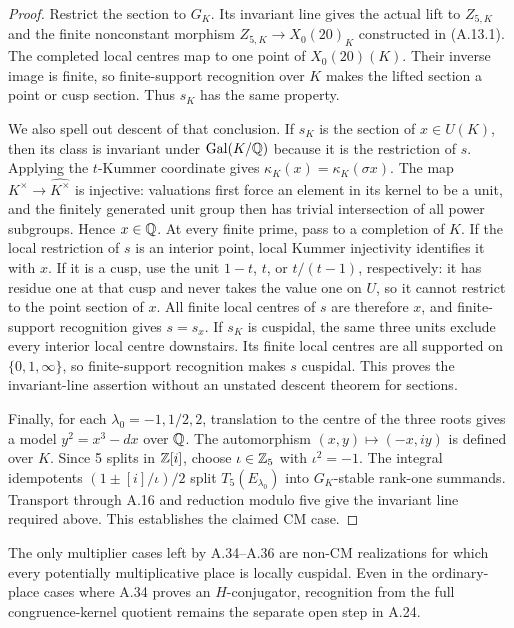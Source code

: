 \begin{proof}
Restrict the section to $G_K$.  Its invariant line gives the actual
lift to $Z_{5,K}$ and the finite nonconstant morphism
$Z_{5,K}\to X_0(20)_K$ constructed in (A.13.1).
The completed local centres map to one point of $X_0(20)(K)$.
Their inverse image is finite, so finite-support recognition over
$K$ makes the lifted section a point or cusp section.  Thus $s_K$
has the same property.

We also spell out descent of that conclusion.  If $s_K$ is the section
of $x\in U(K)$, then its class is invariant under
$\operatorname{Gal}(K/\mathbb Q)$ because it is the restriction of $s$.
Applying the $t$-Kummer coordinate gives
$\kappa_K(x)=\kappa_K(\sigma x)$.
The map $K^\times\to\widehat{K^\times}$ is injective: valuations
first force an element in its kernel to be a unit, and the finitely
generated unit group then has trivial intersection of all power
subgroups.  Hence $x\in\mathbb Q$.
At every finite prime, pass to a completion of $K$.  If the local
restriction of $s$ is an interior point, local Kummer injectivity
identifies it with $x$.  If it is a cusp, use the unit $1-t$, $t$, or
$t/(t-1)$, respectively: it has residue one at that cusp and never
takes the value one on $U$, so it cannot restrict to the point section
of $x$.  All finite local centres of $s$ are therefore $x$, and
finite-support recognition gives $s=s_x$.
If $s_K$ is cuspidal, the same three units exclude every interior
local centre downstairs.  Its finite local centres are all supported
on $\{0,1,\infty\}$, so finite-support recognition makes $s$
cuspidal.  This proves the invariant-line assertion without an
unstated descent theorem for sections.

Finally, for each $\lambda_0=-1,1/2,2$, translation to the centre of
the three roots gives a model $y^2=x^3-dx$ over $\mathbb Q$.
The automorphism $(x,y)\mapsto(-x,iy)$ is defined over $K$.
Since 5 splits in $\mathbb Z[i]$, choose $\iota\in\mathbb Z_5$ with
$\iota^2=-1$.  The integral idempotents
$(1\pm[i]/\iota)/2$ split $T_5(E_{\lambda_0})$ into
$G_K$-stable rank-one summands.  Transport through A.16 and reduction
modulo five give the invariant line required above.  This establishes
the claimed CM case.
\end{proof}
The only multiplier cases left by A.34--A.36 are non-CM realizations
for which every potentially multiplicative place is locally cuspidal.
Even in the ordinary-place cases where A.34 proves an $H$-conjugator,
recognition from the full congruence-kernel quotient remains the
separate open step in A.24.

